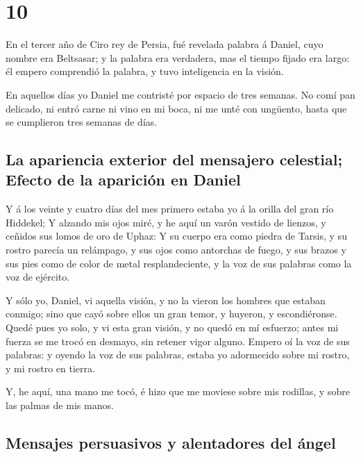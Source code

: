 \hypertarget{section-9}{%
\section{10}\label{section-9}}

 En el tercer año de Ciro rey de Persia, fué revelada
palabra á Daniel, cuyo nombre era Beltsasar; y la palabra era verdadera,
mas el tiempo fijado era largo: él empero comprendió la palabra, y tuvo
inteligencia en la visión.

 En aquellos días yo Daniel me contristé por espacio de tres
semanas.  No comí pan delicado, ni entró carne ni vino en mi
boca, ni me unté con ungüento, hasta que se cumplieron tres semanas de
días.

\hypertarget{la-apariencia-exterior-del-mensajero-celestial-efecto-de-la-apariciuxf3n-en-daniel}{%
\subsection{La apariencia exterior del mensajero celestial; Efecto de la
aparición en
Daniel}\label{la-apariencia-exterior-del-mensajero-celestial-efecto-de-la-apariciuxf3n-en-daniel}}

 Y á los veinte y cuatro días del mes primero estaba yo á la
orilla del gran río Hiddekel;  Y alzando mis ojos miré, y he
aquí un varón vestido de lienzos, y ceñidos sus lomos de oro de Uphaz:
 Y su cuerpo era como piedra de Tarsis, y su rostro parecía
un relámpago, y sus ojos como antorchas de fuego, y sus brazos y sus
pies como de color de metal resplandeciente, y la voz de sus palabras
como la voz de ejército.

 Y sólo yo, Daniel, vi aquella visión, y no la vieron los
hombres que estaban conmigo; sino que cayó sobre ellos un gran temor, y
huyeron, y escondiéronse.  Quedé pues yo solo, y vi esta
gran visión, y no quedó en mí esfuerzo; antes mi fuerza se me trocó en
desmayo, sin retener vigor alguno.  Empero oí la voz de sus
palabras: y oyendo la voz de sus palabras, estaba yo adormecido sobre mi
rostro, y mi rostro en tierra.

 Y, he aquí, una mano me tocó, é hizo que me moviese sobre
mis rodillas, y sobre las palmas de mis manos.

\hypertarget{mensajes-persuasivos-y-alentadores-del-uxe1ngel}{%
\subsection{Mensajes persuasivos y alentadores del
ángel}\label{mensajes-persuasivos-y-alentadores-del-uxe1ngel}}

